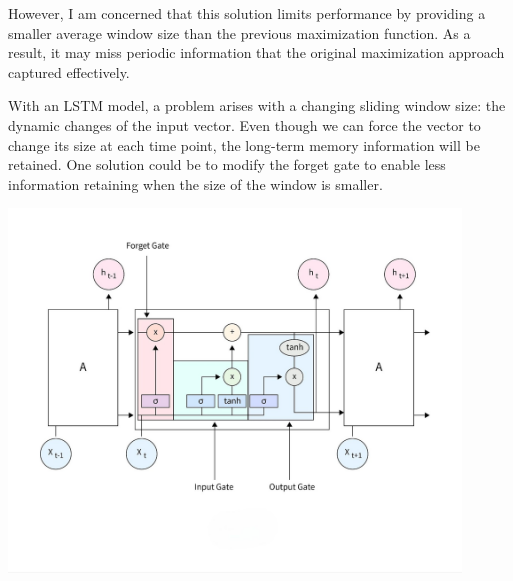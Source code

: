 \documentclass[letterpaper,11pt]{article}
\begin{document}
However, I am concerned that this solution limits performance by providing a smaller average window size than the previous maximization function. As a result, it may miss periodic information that the original maximization approach captured effectively.
\bigskip

With an LSTM model, a problem arises with a changing sliding window size: the dynamic changes of the input vector. Even though we can force the vector to change its size at each time point, the long-term memory information will be retained. One solution could be to modify the forget gate to enable less information retaining when the size of the window is smaller.


\begin{center}
\includegraphics[width=0.9\textwidth]{img/LSTM_archi.jpg}
\end{center}
\end{document}
